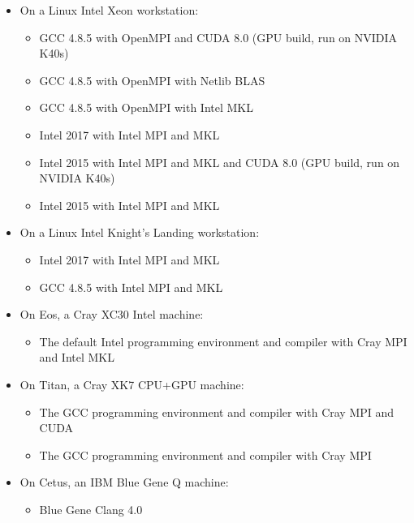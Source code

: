 \begin{itemize}
\item On a Linux Intel Xeon workstation:
  \begin{itemize}
  \item GCC 4.8.5 with OpenMPI and CUDA 8.0 (GPU build, run on NVIDIA K40s)
  \item GCC 4.8.5 with OpenMPI with Netlib BLAS
  \item GCC 4.8.5 with OpenMPI with Intel MKL
  \item Intel 2017 with Intel MPI and MKL
  \item Intel 2015 with Intel MPI and MKL and CUDA 8.0 (GPU build, run on NVIDIA K40s)
  \item Intel 2015 with Intel MPI  and MKL
  \end{itemize}
\item On a Linux Intel Knight's Landing workstation:
  \begin{itemize}
  \item Intel 2017 with Intel MPI and MKL
 \item GCC 4.8.5 with Intel MPI and MKL
  \end{itemize}
\item On Eos, a Cray XC30 Intel machine:
  \begin{itemize}
\item The default Intel programming environment and compiler with Cray MPI and Intel MKL
  \end{itemize}

\item On Titan, a Cray XK7 CPU+GPU machine:
  \begin{itemize}
  \item The GCC programming environment and compiler with Cray MPI and CUDA
  \item The GCC programming environment and compiler with Cray MPI
  \end{itemize}
\item On Cetus, an IBM Blue Gene Q machine:
\begin{itemize}
\item Blue Gene Clang 4.0
\end{itemize}
\end{itemize}

